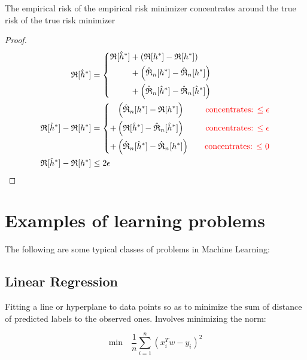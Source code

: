 \documentclass[12pt]{report}
\begin{document}
\begin{theorem}
The empirical risk of the empirical risk minimizer concentrates around the true risk of the true risk minimizer
\end{theorem}

\begin{proof}
\begin{align}
\mathfrak R[\hat{h}^*] & = \left\{
  \begin{aligned} 
     \mathfrak R[\hat{h}^*] & + \left( \mathfrak R[h^*] - \mathfrak R[h^*] \right) \\
    & + \left( \hat{\mathfrak R}_n[h^*] - \hat{\mathfrak R}_n[h^*] \right) \\
    & + \left( \hat{\mathfrak R}_n[\hat{h}^*] - \hat{\mathfrak R}_n[\hat{h}^*] \right)
  \end{aligned} \right. \\
\mathfrak R[\hat{h}^*] - \mathfrak R[h^*] & = \left\{
  \begin{aligned} 
      & \left( \hat{\mathfrak R}_n[h^*] - \mathfrak R[h^*] \right) \quad & \text{\textcolor{red}{concentrates: $\le \epsilon$}} \\
    + & \left( \mathfrak R[\hat{h}^*] - \hat{\mathfrak R}_n[\hat{h}^*] \right) \quad & \text{\textcolor{red}{concentrates: $\le \epsilon$}} \\
    + & \left( \hat{\mathfrak R}_n[\hat{h}^*] - \hat{\mathfrak R}_n[h^*] \right) \quad & \text{\textcolor{red}{concentrates: $\le 0$}}
  \end{aligned} \right. \\
\mathfrak R[\hat{h}^*] - \mathfrak R[h^*] & \le 2 \epsilon
\end{align}
\end{proof}

\section{Examples of learning problems}
The following are some typical classes of problems in Machine Learning:

\subsection{Linear Regression}
Fitting a line or hyperplane to data points so as to minimize the sum of distance of predicted labels to the observed ones. Involves minimizing the norm:  

\begin{equation}
\text{min} \quad \frac{1}{n} \sum_{i=1}^n ( x_i^Tw - y_i )^2 
\end{equation}
\end{document}
